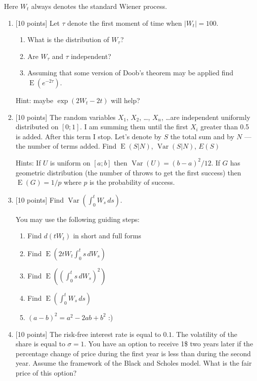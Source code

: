 \documentclass[12pt,a4paper]{article}
\DeclareMathOperator{\Var}{Var}
\DeclareMathOperator{\E}{E}
\begin{document}
\thispagestyle{empty}

Here $W_t$ always denotes the standard Wiener process. 

\vspace{10pt}

\begin{enumerate}


\item $[$10 points] Let $\tau$ denote the first moment of time when $|W_t|=100$. 
\begin{enumerate}
\item What is the distribution of $W_{\tau}$?
\item Are $W_{\tau}$ and $\tau$ independent?
\item Assuming that some version of Doob's theorem may be applied find $\E(e^{-2\tau})$. 
\end{enumerate}
Hint: maybe $\exp(2 W_t - 2 t )$ will help?


\item $[$10 points] The random variables $X_1$, $X_2$, \ldots, $X_n$, \ldots are independent uniformly distributed on $[0; 1]$. I am summing them until the first $X_i$ greater than 0.5 is added. After this term I stop. Let’s denote by $S$ the total sum and by $N$ --- the number of terms added. Find $\E(S|N)$, $\Var(S|N)$, $E(S)$ %

Hints: If $U$ is uniform on $[a;b]$ then $\Var(U)=(b-a)^2/12$. If $G$ has geometric distribution (the number of throws to get the first success) then $\E(G)=1/p$  where $p$  is the probability of success.

\item $[$10 points] Find $\Var\left(  \int_0^t W_s \, ds  \right)$. 

You may use the following guiding steps:

\begin{enumerate}
\item Find $d(tW_t)$ in short and full forms
\item Find $\E\left(2t W_t\int_0^t s \, dW_s\right)$
\item Find $\E\left(\left(\int_0^t s \, dW_s\right)^2 \right)$
\item Find $\E\left(  \int_0^t W_s \, ds  \right)$
\item $(a-b)^2=a^2-2ab+b^2$ :)
\end{enumerate}

\item $[$10 points] The risk-free interest rate is equal to $0.1$. The volatility of the share is equal to $\sigma=1$. You have an option to receive 1\$ two years later if the percentage change of price during the first year is less than during the second year. Assume the framework of the Black and Scholes model. What is the fair price of this option?


\end{enumerate}
\end{document}
